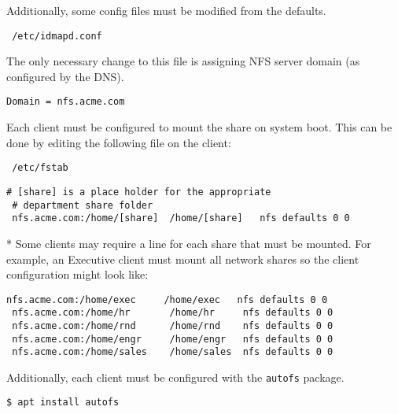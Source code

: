 \noindent
Additionally, some config files must be modified from the defaults. \\

\begin{lstlisting}
 /etc/idmapd.conf
\end{lstlisting}
\vspace{1em}

\noindent
The only necessary change to this file is assigning NFS server domain (as
configured by the DNS). \\

\begin{lstlisting}[backgroundcolor=\color{Gray}]
 Domain = nfs.acme.com
\end{lstlisting}
\vspace{1em}

\noindent
Each client must be configured to mount the share on system boot. This can be
done by editing the following file on the client: \\
\begin{lstlisting}
 /etc/fstab
\end{lstlisting}
\vspace{1em}

\begin{lstlisting}[backgroundcolor=\color{Gray}]
 # [share] is a place holder for the appropriate 
 # department share folder
 nfs.acme.com:/home/[share]  /home/[share]   nfs defaults 0 0
\end{lstlisting}
* Some clients may require a line for each share that must be mounted. For
example, an Executive client must mount all network shares so the client 
configuration might look like: \\

\begin{lstlisting}[backgroundcolor=\color{Gray}]
 nfs.acme.com:/home/exec     /home/exec   nfs defaults 0 0
 nfs.acme.com:/home/hr       /home/hr     nfs defaults 0 0
 nfs.acme.com:/home/rnd      /home/rnd    nfs defaults 0 0
 nfs.acme.com:/home/engr     /home/engr   nfs defaults 0 0
 nfs.acme.com:/home/sales    /home/sales  nfs defaults 0 0
\end{lstlisting}
\vspace{1em}

\noindent
Additionally, each client must be configured with the \lstinline$autofs$ 
package. \\

\begin{lstlisting}[backgroundcolor=\color{Gray}, language=bash]
 $ apt install autofs
\end{lstlisting}
\vspace{1em}

